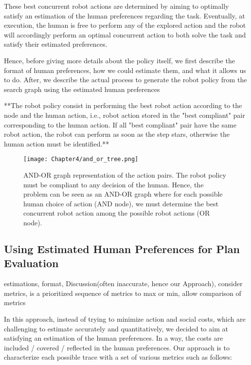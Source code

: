 These best concurrent robot actions are determined by aiming to optimally satisfy an estimation of the human preferences regarding the task. Eventually, at execution, the human is free to perform any of the explored action and the robot will accordingly perform an optimal concurrent action to both solve the task and satisfy their estimated preferences.

Hence, before giving more details about the policy itself, we first describe the format of human preferences, how we could estimate them, and what it allows us to do. After, we describe the actual process to generate the robot policy from the search graph using the estimated human preferences


**The robot policy consist in performing the best robot action according to the node and the human action, i.e., robot action stored in the "best compliant" pair corresponding to the human action.
If all "best compliant" pair have the same robot action, the robot can perform as soon as the step stars, otherwise the human action must be identified.**

\begin{figure}
    \texttt{[image: Chapter4/and\_or\_tree.png]}
    \caption{AND-OR graph representation of the action pairs. 
    The robot policy must be compliant to any decision of the human. Hence, the problem can be seen as an AND-OR graph where for each possible human choice of action (AND node), we must determine the best concurrent robot action among the possible robot actions (OR node).
    }
    \label{fig:and_or}
\end{figure}


    \subsection{Using Estimated Human Preferences for Plan Evaluation}
estimations, format, Discussion(often inaccurate, hence our Approach), consider metrics, is a prioritized sequence of metrics to max or min, allow comparison of metrics

In this approach, instead of trying to minimize action and social costs, which are challenging to estimate accurately and quantitatively, we decided to aim at satisfying an estimation of the human preferences. In a way, the costs are included / covered / reflected in the human preferences. Our approach is to characterize each possible trace with a set of various metrics such as follows:

